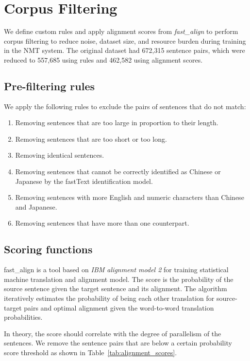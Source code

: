\section{Corpus Filtering} \label{sec:corpus_filtering}

We define custom rules and apply alignment scores from \textit{fast\_align} \cite{dyer2013simple} to perform corpus filtering to reduce noise, dataset size, and resource burden during training in the NMT system. The original dataset had 672,315 sentence pairs, which were reduced to 557,685 using rules and 462,582 using alignment scores.

\subsection{Pre-filtering rules}

We apply the following rules to exclude the pairs of sentences that do not match:

\begin{enumerate}
    \item Removing sentences that are too large in proportion to their length.
    \item Removing sentences that are too short or too long.
    \item Removing identical sentences.
    \item Removing sentences that cannot be correctly identified as Chinese or Japanese by the fastText identification model.
    \item Removing sentences with more English and numeric characters than Chinese and Japanese.
    \item Removing sentences that have more than one counterpart.
\end{enumerate}

\subsection{Scoring functions}

fast\_align is a tool based on \textit{IBM alignment model 2} for training statistical machine translation and alignment model. The score is the probability of the source sentence given the target sentence and its alignment. The algorithm iteratively estimates the probability of being each other translation for source-target pairs and optimal alignment given the word-to-word translation probabilities. 

In theory, the score should correlate with the degree of parallelism of the sentences. We remove the sentence pairs that are below a certain probability score threshold as shown in Table~\ref{tab:alignment_scores}. 

